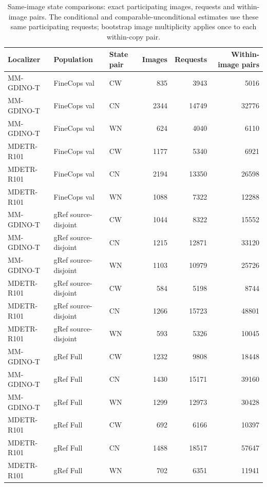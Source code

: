 \begin{table}[t]
\centering\footnotesize
\setlength{\tabcolsep}{3pt}
\renewcommand{\arraystretch}{1.15}
\caption{Same-image state comparisons: exact participating images, requests and within-image pairs. The conditional and comparable-unconditional estimates use these same participating requests; bootstrap image multiplicity applies once to each within-copy pair.}\label{tab:supp_v6_image_counts}
\begin{tabular}{@{}lllrrr@{}}\toprule
Localizer & Population & State pair & Images & Requests & Within-image pairs\\\midrule
MM-GDINO-T & FineCops val & CW & 835 & 3943 & 5016\\
MM-GDINO-T & FineCops val & CN & 2344 & 14749 & 32776\\
MM-GDINO-T & FineCops val & WN & 624 & 4040 & 6110\\
MDETR-R101 & FineCops val & CW & 1177 & 5340 & 6921\\
MDETR-R101 & FineCops val & CN & 2194 & 13350 & 26598\\
MDETR-R101 & FineCops val & WN & 1088 & 7322 & 12288\\
MM-GDINO-T & gRef source-disjoint & CW & 1044 & 8322 & 15552\\
MM-GDINO-T & gRef source-disjoint & CN & 1215 & 12871 & 33120\\
MM-GDINO-T & gRef source-disjoint & WN & 1103 & 10979 & 25726\\
MDETR-R101 & gRef source-disjoint & CW & 584 & 5198 & 8744\\
MDETR-R101 & gRef source-disjoint & CN & 1266 & 15723 & 48801\\
MDETR-R101 & gRef source-disjoint & WN & 593 & 5326 & 10045\\
MM-GDINO-T & gRef Full & CW & 1232 & 9808 & 18448\\
MM-GDINO-T & gRef Full & CN & 1430 & 15171 & 39160\\
MM-GDINO-T & gRef Full & WN & 1299 & 12973 & 30428\\
MDETR-R101 & gRef Full & CW & 692 & 6166 & 10397\\
MDETR-R101 & gRef Full & CN & 1488 & 18517 & 57647\\
MDETR-R101 & gRef Full & WN & 702 & 6351 & 11941\\
\bottomrule\end{tabular}
\end{table}
